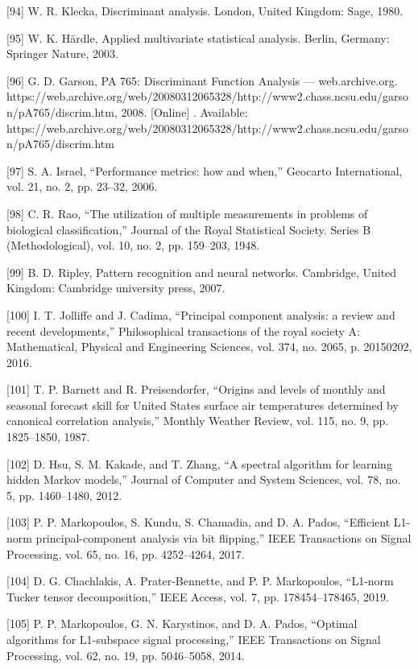 \documentclass[sn-mathphys-num]{sn-jnl}%
\begin{document}
[94] W. R. Klecka, Discriminant analysis. London, United Kingdom: Sage, 1980.

[95] W. K. Härdle, Applied multivariate statistical analysis. Berlin, Germany: Springer Nature, 2003.

[96] G. D. Garson, PA 765: Discriminant Function Analysis — web.archive.org. https://web.archive.org/web/20080312065328/http://www2.chass.ncsu.edu/garson/pA765/discrim.htm, 2008. [Online] . Available: https://web.archive.org/web/20080312065328/http://www2.chass.ncsu.edu/garson/pA765/discrim.htm

[97] S. A. Israel, “Performance metrics: how and when,” Geocarto International, vol. 21, no. 2, pp. 23–32, 2006.

[98] C. R. Rao, “The utilization of multiple measurements in problems of biological classification,” Journal of the Royal Statistical Society. Series B (Methodological), vol. 10, no. 2, pp. 159–203, 1948.

[99] B. D. Ripley, Pattern recognition and neural networks. Cambridge, United Kingdom: Cambridge university press, 2007.

[100] I. T. Jolliffe and J. Cadima, “Principal component analysis: a review and recent developments,” Philosophical transactions of the royal society A: Mathematical, Physical and Engineering Sciences, vol. 374, no. 2065, p. 20150202, 2016.

[101] T. P. Barnett and R. Preisendorfer, “Origins and levels of monthly and seasonal forecast skill for United States surface air temperatures determined by canonical correlation analysis,” Monthly Weather Review, vol. 115, no. 9, pp. 1825–1850, 1987.

[102] D. Hsu, S. M. Kakade, and T. Zhang, “A spectral algorithm for learning hidden Markov models,” Journal of Computer and System Sciences, vol. 78, no. 5, pp. 1460–1480, 2012.

[103] P. P. Markopoulos, S. Kundu, S. Chamadia, and D. A. Pados, “Efficient L1-norm principal-component analysis via bit flipping,” IEEE Transactions on Signal Processing, vol. 65, no. 16, pp. 4252–4264, 2017.

[104] D. G. Chachlakis, A. Prater-Bennette, and P. P. Markopoulos, “L1-norm Tucker tensor decomposition,” IEEE Access, vol. 7, pp. 178454–178465, 2019.

[105] P. P. Markopoulos, G. N. Karystinos, and D. A. Pados, “Optimal algorithms for L1-subspace signal processing,” IEEE Transactions on Signal Processing, vol. 62, no. 19, pp. 5046–5058, 2014.
\end{document}
